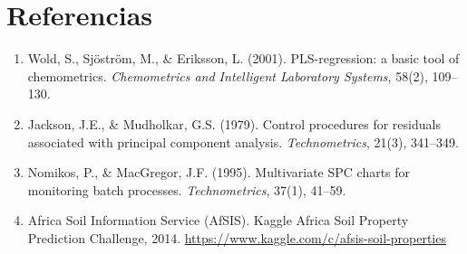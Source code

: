 \documentclass[12pt, a4paper]{article}
\begin{document}
\newpage

\section*{Referencias}

\begin{enumerate}
  \item Wold, S., Sjöström, M., \& Eriksson, L. (2001). PLS-regression: a basic tool
        of chemometrics. \textit{Chemometrics and Intelligent Laboratory Systems},
        58(2), 109--130.

  \item Jackson, J.E., \& Mudholkar, G.S. (1979). Control procedures for residuals
        associated with principal component analysis. \textit{Technometrics},
        21(3), 341--349.

  \item Nomikos, P., \& MacGregor, J.F. (1995). Multivariate SPC charts for monitoring
        batch processes. \textit{Technometrics}, 37(1), 41--59.

  \item Africa Soil Information Service (AfSIS). Kaggle Africa Soil Property Prediction
        Challenge, 2014.
        \url{https://www.kaggle.com/c/afsis-soil-properties}
\end{enumerate}
\end{document}
